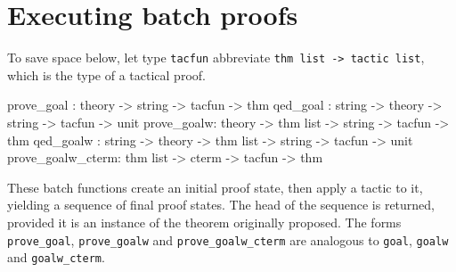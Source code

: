 \section{Executing batch proofs}
%
To save space below, let type \texttt{tacfun} abbreviate \texttt{thm list ->
  tactic list}, which is the type of a tactical proof.
\begin{ttbox}
prove_goal :           theory ->             string -> tacfun -> thm
qed_goal   : string -> theory ->             string -> tacfun -> unit
prove_goalw:           theory -> thm list -> string -> tacfun -> thm
qed_goalw  : string -> theory -> thm list -> string -> tacfun -> unit
prove_goalw_cterm:               thm list -> cterm  -> tacfun -> thm
\end{ttbox}
These batch functions create an initial proof state, then apply a tactic to
it, yielding a sequence of final proof states.  The head of the sequence is
returned, provided it is an instance of the theorem originally proposed.
The forms {\tt prove_goal}, {\tt prove_goalw} and {\tt prove_goalw_cterm}
are analogous to {\tt goal}, {\tt goalw} and {\tt goalw_cterm}.

